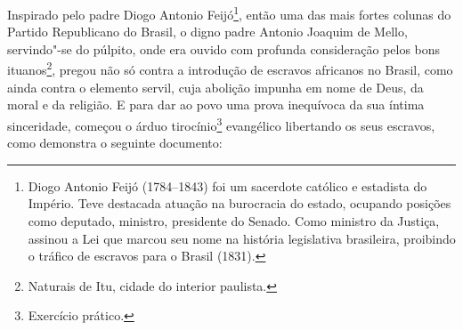 Inspirado pelo padre Diogo Antonio Feijó\footnote{Diogo Antonio Feijó \label{feijo}
  (1784--1843) foi um sacerdote católico e estadista do Império. Teve
  destacada atuação na burocracia do estado, ocupando posições como
  deputado, ministro, presidente do Senado. Como ministro da Justiça,
  assinou a Lei que marcou seu nome na história legislativa brasileira,
  proibindo o tráfico de escravos para o Brasil (1831).}, então uma das
mais fortes colunas do Partido Republicano do Brasil, o digno padre
Antonio Joaquim de Mello, servindo"-se do púlpito, onde era ouvido com
profunda consideração pelos bons ituanos\footnote{Naturais de Itu,
  cidade do interior paulista.}, pregou não só contra a introdução de
escravos africanos no Brasil, como ainda contra o elemento servil, cuja
abolição impunha em nome de Deus, da moral e da religião. E para dar ao
povo uma prova inequívoca da sua íntima sinceridade, começou o árduo
tirocínio\footnote{Exercício prático.} evangélico libertando os seus
escravos, como demonstra o seguinte documento:

